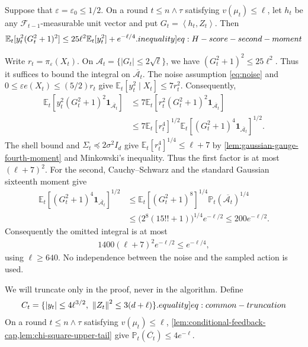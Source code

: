 \documentclass[12pt,cleveref]{jmlr}
\renewenvironment{proof}[1][\proofname]
{\par\noindent{\bfseries\upshape #1\ }}
{\jmlrQED}
\newcommand{\eqlabel}[1]{\label[equality]{#1}}
\newcommand{\ineqlabel}[1]{\label[inequality]{#1}}
\newcommand{\E}{\mathbb E}
\newcommand{\Pp}{\mathbb P}
\newcommand{\F}{\mathcal F}
\newcommand{\1}{\mathbf 1}
\newcommand{\eps}{\varepsilon}
\newcommand{\ip}[2]{\left\langle #1,#2\right\rangle}
\newcommand{\norm}[1]{\left\lVert #1\right\rVert}
\begin{document}
\begin{lemma}
    \label{lem:gaussian-score-localisation}
    Suppose that $\eps=\eps_0\leq1/2$. On a round $t\leq n\wedge\tau$
    satisfying $v(\mu_t)\leq\ell$, let
    $h_t$ be any $\F_{t-1}$-measurable unit vector and put
    $G_t=\ip{h_t}{Z_t}$. Then
    \begin{align}
        \E_t[y_t^2(G_t^2+1)^2]
        \leq25\ell^2\E_t[y_t^2]+e^{-\ell/4}.
        \ineqlabel{eq:H-score-second-moment}
    \end{align}
\end{lemma}
\begin{proof}
    Write $r_t=\pi_\eps(X_t)$.
    On $\mathcal A_t=\{|G_t|\leq2\sqrt\ell\}$, we have
    $(G_t^2+1)^2\leq25\ell^2$. Thus it suffices to bound the integral on
    $\overline{\mathcal A_t}$. The noise assumption \cref{eq:noise} and
    $0\leq\eps e(X_t)\leq(5/2)r_t$ give
    $\E_t[y_t^2\mid X_t]\leq7r_t^2$. Consequently,
    \begin{align}
        \E_t[y_t^2(G_t^2+1)^2\1_{\overline{\mathcal A_t}}]
        & \leq7\E_t[r_t^2(G_t^2+1)^2\1_{\overline{\mathcal A_t}}]
        \\
        & \leq7\E_t[r_t^4]^{1/2}
        \E_t[(G_t^2+1)^4\1_{\overline{\mathcal A_t}}]^{1/2}.
    \end{align}
    The shell bound and $\Sigma_t\preceq2\sigma^2I_d$ give
    $\E_t[r_t^4]^{1/4}\leq\ell+7$ by
    \cref{lem:gaussian-gauge-fourth-moment} and Minkowski's inequality.
    Thus the first factor is at most $(\ell+7)^2$.
    For the second, Cauchy--Schwarz and
    the standard Gaussian sixteenth moment give
    \begin{align}
        \E_t[(G_t^2+1)^4\1_{\overline{\mathcal A_t}}]^{1/2}
        & \leq\E_t[(G_t^2+1)^8]^{1/4}\Pp_t(\overline{\mathcal A_t})^{1/4}
        \\
        & \leq\bigl(2^8(15!!+1)\bigr)^{1/4}e^{-\ell/2}
        \leq200e^{-\ell/2}.
    \end{align}
    Consequently the omitted integral is at most
    \begin{align}
        1400(\ell+7)^2e^{-\ell/2}\leq e^{-\ell/4},
    \end{align}
    using $\ell\geq640$. No independence between the noise and the
    sampled action is used.
\end{proof}

We will truncate only in the proof, never in the algorithm. Define
\begin{align}
    C_t=\{|y_t|\leq4\ell^{3/2},\ \norm{Z_t}^2\leq3(d+\ell)\}.
    \eqlabel{eq:common-truncation}
\end{align}
On a round $t\leq n\wedge\tau$ satisfying $v(\mu_t)\leq\ell$,
\cref{lem:conditional-feedback-cap,lem:chi-square-upper-tail}
give $\Pp_t(\overline{C_t})\leq4e^{-\ell}$.
\end{document}
